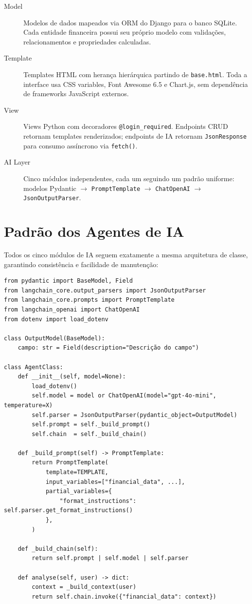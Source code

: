 \documentclass[12pt, a4paper, oneside]{report}
\begin{document}
\begin{description}
  \item[\textcolor{secondary}{Model}] Modelos de dados mapeados via ORM do Django para o banco SQLite. Cada entidade financeira possui seu próprio modelo com validações, relacionamentos e propriedades calculadas.
  \item[\textcolor{secondary}{Template}] Templates HTML com herança hierárquica partindo de \texttt{base.html}. Toda a interface usa CSS variables, Font Awesome 6.5 e Chart.js, sem dependência de frameworks JavaScript externos.
  \item[\textcolor{secondary}{View}] Views Python com decoradores \texttt{@login\_required}. Endpoints CRUD retornam templates renderizados; endpoints de IA retornam \texttt{JsonResponse} para consumo assíncrono via \texttt{fetch()}.
  \item[\textcolor{secondary}{AI Layer}] Cinco módulos independentes, cada um seguindo um padrão uniforme: modelos Pydantic $\rightarrow$ \texttt{PromptTemplate} $\rightarrow$ \texttt{ChatOpenAI} $\rightarrow$ \texttt{JsonOutputParser}.
\end{description}

\section{Padrão dos Agentes de IA}

Todos os cinco módulos de IA seguem exatamente a mesma arquitetura de classe, garantindo consistência e facilidade de manutenção:

\begin{lstlisting}[style=python, caption={Padrão base de todos os agentes IA}]
from pydantic import BaseModel, Field
from langchain_core.output_parsers import JsonOutputParser
from langchain_core.prompts import PromptTemplate
from langchain_openai import ChatOpenAI
from dotenv import load_dotenv

class OutputModel(BaseModel):
    campo: str = Field(description="Descrição do campo")

class AgentClass:
    def __init__(self, model=None):
        load_dotenv()
        self.model = model or ChatOpenAI(model="gpt-4o-mini", temperature=X)
        self.parser = JsonOutputParser(pydantic_object=OutputModel)
        self.prompt = self._build_prompt()
        self.chain  = self._build_chain()

    def _build_prompt(self) -> PromptTemplate:
        return PromptTemplate(
            template=TEMPLATE,
            input_variables=["financial_data", ...],
            partial_variables={
                "format_instructions": self.parser.get_format_instructions()
            },
        )

    def _build_chain(self):
        return self.prompt | self.model | self.parser

    def analyse(self, user) -> dict:
        context = _build_context(user)
        return self.chain.invoke({"financial_data": context})
\end{lstlisting}
\end{document}
